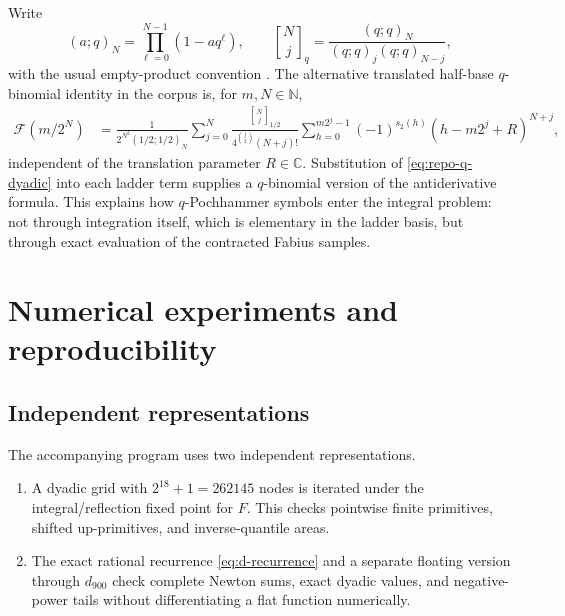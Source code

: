 \documentclass[11pt,oneside]{article}
\numberwithin{equation}{section}
\theoremstyle{definition}
\theoremstyle{remark}
\newcommand{\C}{\mathbb C}
\newcommand{\N}{\mathbb N}
\newcommand{\wt}{s_2}
\newcommand{\qbinom}[3]{\genfrac{[}{]}{0pt}{}{#1}{#2}_{#3}}
\begin{document}
Write
\begin{equation}
 (a;q)_N=\prod_{\ell=0}^{N-1}(1-aq^\ell),\qquad
 \qbinom Njq=\frac{(q;q)_N}{(q;q)_j(q;q)_{N-j}},              \label{eq:q-notation}
\end{equation}
with the usual empty-product convention \cite{gasper2004}.  The alternative translated
half-base $q$-binomial identity in the corpus is, for $m,N\in\N$,
\begin{align}
 \mathcal F(m/2^N)
 &=\frac{1}{2^{N^2}(1/2;1/2)_N}
 \sum_{j=0}^{N}
 \frac{\qbinom Nj{1/2}}{4^{\binom j2}(N+j)!}
 \sum_{h=0}^{m2^j-1}(-1)^{\wt(h)}(h-m2^j+R)^{N+j},            \label{eq:repo-q-dyadic}
\end{align}
independent of the translation parameter $R\in\C$.  Substitution of
\eqref{eq:repo-q-dyadic} into each ladder term supplies a $q$-binomial version of the
antiderivative formula.  This explains how $q$-Pochhammer symbols enter the integral problem:
not through integration itself, which is elementary in the ladder basis, but through exact
evaluation of the contracted Fabius samples.

\section{Numerical experiments and reproducibility}
\label{sec:numerics}

\subsection{Independent representations}

The accompanying program  uses two independent
representations.

\begin{enumerate}
\item A dyadic grid with $2^{18}+1=262145$ nodes is iterated under the integral/reflection
      fixed point for $F$.  This checks pointwise finite primitives, shifted up-primitives,
      and inverse-quantile areas.
\item The exact rational recurrence \eqref{eq:d-recurrence} and a separate floating version
      through $d_{900}$ check complete Newton sums, exact dyadic values, and negative-power
      tails without differentiating a flat function numerically.
\end{enumerate}
\end{document}

